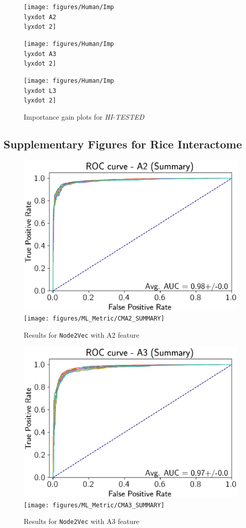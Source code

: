 \begin{figure}[h]
\noindent \begin{centering}
\caption{\label{F8-importance-H2}Importance gain plots for \emph{HI-TESTED}}
\par\end{centering}
\begin{centering}
\texttt{[image: figures/Human/Imp\\lyxdot A2\\lyxdot 2]}
\par\end{centering}
\begin{centering}
\texttt{[image: figures/Human/Imp\\lyxdot A3\\lyxdot 2]}
\par\end{centering}
\centering{}\texttt{[image: figures/Human/Imp\\lyxdot L3\\lyxdot 2]}
\end{figure}


\subsection*{Supplementary Figures for Rice Interactome}

\begin{figure}[h]
\noindent \begin{centering}
\caption{\label{F2}Results for \texttt{Node2Vec} with A2 feature}
\par\end{centering}
\noindent \raggedleft{}\includegraphics[width=0.48\columnwidth]{figures/ML_Metric/ROCA2_SUMMARY}\texttt{[image: figures/ML\_Metric/CMA2\_SUMMARY]}
\end{figure}

\begin{figure}[h]
\noindent \begin{centering}
\caption{\label{F3}Results for \texttt{Node2Vec} with A3 feature}
\par\end{centering}
\noindent \raggedleft{}\includegraphics[width=0.48\columnwidth]{figures/ML_Metric/ROCA3_SUMMARY}\texttt{[image: figures/ML\_Metric/CMA3\_SUMMARY]}
\end{figure}

